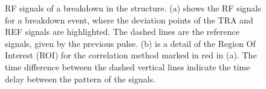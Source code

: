  \begin{figure}[h]
\centering
   \hspace{1mm}
\caption{RF signals of a breakdown in the structure. (a) shows the RF signals for a breakdown event, where the deviation points of the TRA and REF signals are highlighted. The dashed lines are the reference signals, given by the previous pulse. (b) is a detail of the Region Of Interest (ROI) for the correlation method marked in red in (a). The time difference between the dashed vertical lines indicate the time delay between the pattern of the signals.}
 \label{dev_pt}
 \end{figure}


